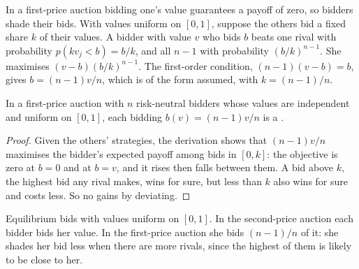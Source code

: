In a first-price auction bidding one's value guarantees a payoff of zero, so bidders shade their bids. With values
uniform on $[0, 1]$, suppose the others bid a fixed share $k$ of their values. A bidder with value $v$ who bids $b$ beats one
rival with probability $p(k v_j < b) = b/k$, and all $n - 1$ with probability $(b/k)^{n-1}$. She maximises $(v - b)(b/k)^{n-1}$. The
first-order condition, $(n - 1)(v - b) = b$, gives $b = (n - 1)v/n$, which is of the form assumed, with $k = (n - 1)/n$.

\begin{proposition}\label{prop:b2:bayesian-games:first-price-bids}
In a first-price auction with $n$ risk-neutral bidders whose values are independent and uniform on $[0, 1]$, each bidding
$b(v) = (n - 1)v/n$ is a .
\end{proposition}

\begin{proof}
Given the others' strategies, the derivation shows that $(n - 1)v/n$ maximises the bidder's expected payoff among bids
in $[0, k]$: the objective is zero at $b = 0$ and at $b = v$, and it rises then falls between them. A bid above $k$, the highest bid any
rival makes, wins for sure, but less than $k$ also wins for sure and costs less. So no  gains by deviating.
\end{proof}

\begin{omfigure}

{\small Equilibrium bids with values uniform on $[0, 1]$. In the second-price auction each bidder bids her value. In the
first-price auction she bids $(n - 1)/n$ of it: she shades her bid less when there are more rivals, since the highest of
them is likely to be close to her.}
\end{omfigure}


